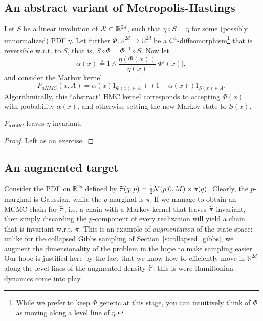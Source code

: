 \subsection{An abstract variant of Metropolis-Hastings}
\label{s:abstract_HMC}
Let $S$ be a linear involution of $\mathcal{X}\subset\mathbb{R}^{2d}$, such that $\eta\circ S = \eta$ for some (possibly unnormalized) PDF $\eta$.
Let further $\Phi:\mathbb{R}^{2d}\rightarrow \mathbb{R}^{2d}$ be a $C^1$-diffeomorphism\footnote{
    While we prefer to keep $\Phi$ generic at this stage, you can intuitively think of $\Phi$ as moving along a level line of $\eta$.
} 
that is reversible w.r.t. to $S$, that is, $S\circ \Phi = \Phi^{-1}\circ S$.
Now let 
\begin{equation}
    \label{e:acceptance_probability_abstract_HMC}
    \alpha(x) \triangleq 1\wedge \frac{\eta(\Phi(x))}{\eta(x)} \vert\Phi'(x)\vert,
\end{equation}
and consider the Markov kernel
$$
P_{aHMC}(x,A) = \alpha(x) 1_{\Phi(x)\in A} + (1-\alpha(x))1_{S(x)\in A}.
$$
Algorithmically, this ``abstract" HMC kernel corresponds to accepting $\Phi(x)$ with probability $\alpha(x)$, and otherwise setting the new Markov state to $S(x)$.
\begin{proposition}
\label{p:invariance_abstract_HMC}
$P_{aHMC}$ leaves $\eta$ invariant.
\end{proposition}
\begin{proof}
    Left as an exercise.
\end{proof}

\subsection{An augmented target}
Consider the PDF on $\mathbb{R}^{2d}$ defined by $\widetilde{\pi}(q,p) = \frac12 \mathcal{N}(p\vert 0, M) \times \pi(q)$. 
Clearly, the $p$-marginal is Gaussian, while the $q$-marginal is $\pi$. 
If we manage to obtain an MCMC chain for $\widetilde{\pi}$, i.e. a chain with a Markov kernel that leaves $\widetilde{\pi}$ invariant, then simply discarding the $p$-component of every realization will yield a chain that is invariant w.r.t. $\pi$. 
This is an example of \emph{augmentation} of the state space: unlike for the collapsed Gibbs sampling of Section~\ref{s:collapsed_gibbs}, we augment the dimensionality of the problem in the hope to make sampling easier. 
Our hope is justified here by the fact that we know how to efficiently move in $\mathbb{R}^{2d}$ along the level lines of the augmented density $\widetilde{\pi}$: this is were Hamiltonian dynamics come into play.

